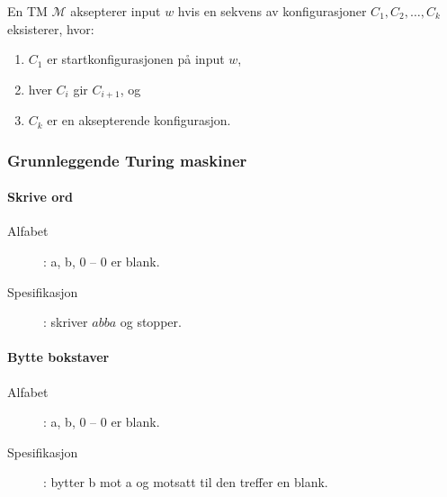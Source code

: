 \documentclass[11pt,a4paper]{article}
\begin{document}
En TM $\mathcal{M}$ aksepterer input $w$ hvis en sekvens av konfigurasjoner $C_1, C_2, \dots,C_k$ eksisterer, hvor:
\begin{enumerate}
	\item{$C_1$ er startkonfigurasjonen på input $w$,}
	\item{hver $C_i$ gir $C_{i+1}$, og}
	\item{$C_k$ er en aksepterende konfigurasjon.}
\end{enumerate}

\subsubsection{Grunnleggende Turing maskiner}

\paragraph{Skrive ord}
\begin{description}
\item[Alfabet]: a, b, 0 -- 0 er blank.
\item[Spesifikasjon]: skriver $abba$ og stopper.
\end{description}
\begin{figure}[h!]
\centering
{}
\end{figure}

\paragraph{Bytte bokstaver}
\begin{description}
\item[Alfabet]: a, b, 0 -- 0 er blank.
\item[Spesifikasjon]: bytter b mot a og motsatt til den treffer en blank.
\end{description}
\begin{figure}[h!]
\centering
{}
\end{figure}
\end{document}
